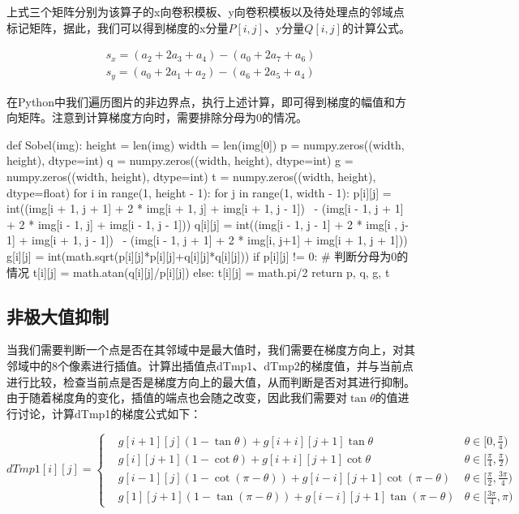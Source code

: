 \documentclass{article}
\begin{document}
上式三个矩阵分别为该算子的x向卷积模板、y向卷积模板以及待处理点的邻域点标记矩阵，据此，我们可以得到梯度的x分量$P[i,j]$、y分量$Q[i,j]$的计算公式。

\begin{equation}
\begin{array}{l}{s_{x}=\left(a_{2}+2 a_{3}+a_{4}\right)-\left(a_{0}+2 a_{7}+a_{6}\right)} \\ {s_{y}=\left(a_{0}+2 a_{1}+a_{2}\right)-\left(a_{6}+2 a_{5}+a_{4}\right)}\end{array}
\end{equation}

在Python中我们遍历图片的非边界点，执行上述计算，即可得到梯度的幅值和方向矩阵。注意到计算梯度方向时，需要排除分母为0的情况。
\begin{python}
def Sobel(img):
    height = len(img)
    width = len(img[0])
    p = numpy.zeros((width, height), dtype=int)
    q = numpy.zeros((width, height), dtype=int)
    g = numpy.zeros((width, height), dtype=int)
    t = numpy.zeros((width, height), dtype=float)
    for i in range(1, height - 1):
        for j in range(1, width - 1):
            p[i][j] = int((img[i + 1, j + 1] + 2 * img[i + 1, j] + img[i + 1, j - 1]) \
                      - (img[i - 1, j + 1] + 2 * img[i - 1, j] + img[i - 1, j - 1]))
            q[i][j] = int((img[i - 1, j - 1] + 2 * img[i , j-1] + img[i + 1, j - 1]) \
                      - (img[i - 1, j + 1] + 2 * img[i, j+1] + img[i + 1, j + 1]))
            g[i][j] = int(math.sqrt(p[i][j]*p[i][j]+q[i][j]*q[i][j]))
            if p[i][j] != 0:     # 判断分母为0的情况
                t[i][j] = math.atan(q[i][j]/p[i][j])
            else:
                t[i][j] = math.pi/2
    return p, q, g, t
\end{python}

\subsection{非极大值抑制}
当我们需要判断一个点是否在其邻域中是最大值时，我们需要在梯度方向上，对其邻域中的8个像素进行插值。计算出插值点dTmp1、dTmp2的梯度值，并与当前点进行比较，检查当前点是否是梯度方向上的最大值，从而判断是否对其进行抑制。由于随着梯度角的变化，插值的端点也会随之改变，因此我们需要对$\tan\theta$的值进行讨论，计算dTmp1的梯度公式如下：

\begin{equation}
dTmp1[i][j]=\left\{
\begin{array}{rcl}
& g[i+1][j] (1-\tan\theta) + g[i+i][j+1]\tan \theta  & \theta \in [0,\frac{\pi}{4}) \\
& g[i][j+1] (1-\cot\theta) + g[i+i][j+1]\cot \theta  & \theta \in [\frac{\pi}{4},\frac{\pi}{2}) \\
& g[i-1][j] (1-\cot(\pi-\theta)) + g[i-i][j+1]\cot(\pi-\theta)  &  \theta \in [\frac{\pi}{2},\frac{3\pi}{4}) \\
& g[1][j+1] (1-\tan(\pi-\theta)) + g[i-i][j+1]\tan(\pi-\theta) &  \theta \in [\frac{3\pi}{4},\pi) 
\end{array} \right.
\end{equation}
\end{document}
